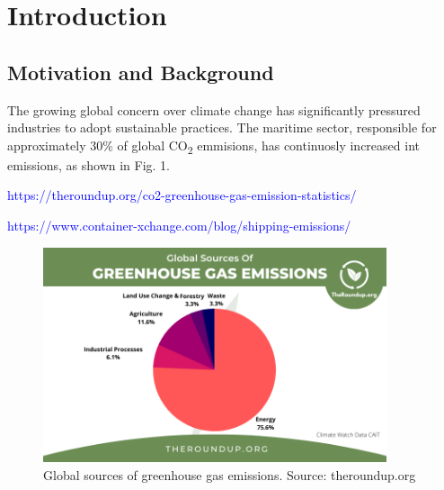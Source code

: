 \chapter{Introduction}


\section{Motivation and Background}


The growing global concern over climate change has significantly pressured industries to adopt sustainable practices. The maritime sector, responsible for approximately 30$\%$ of global CO\textsubscript{2} emmisions, has continuosly increased int emissions, as shown in Fig. 1.

\textcolor{blue}{https://theroundup.org/co2-greenhouse-gas-emission-statistics/}

\textcolor{blue}{https://www.container-xchange.com/blog/shipping-emissions/}

\begin{figure}[h!]
    \centering
    \includegraphics[width=0.9\textwidth]{images/chapter01/global_emss}
    \caption{Global sources of greenhouse gas emissions. Source: theroundup.org}
    \label{fig:global_emss}
\end{figure}

